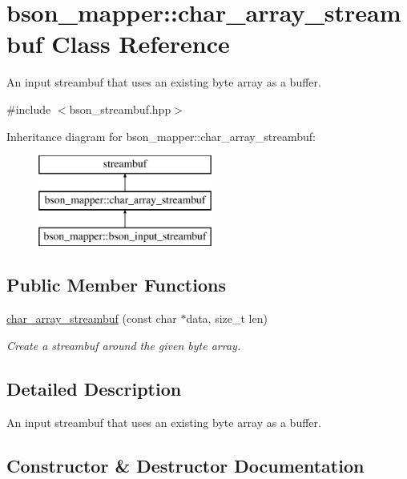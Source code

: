 \hypertarget{classbson__mapper_1_1char__array__streambuf}{}\section{bson\+\_\+mapper\+:\+:char\+\_\+array\+\_\+streambuf Class Reference}
\label{classbson__mapper_1_1char__array__streambuf}


An input streambuf that uses an existing byte array as a buffer.  




{\ttfamily \#include $<$bson\+\_\+streambuf.\+hpp$>$}

Inheritance diagram for bson\+\_\+mapper\+:\+:char\+\_\+array\+\_\+streambuf\+:\begin{figure}[H]
\begin{center}
\leavevmode
\includegraphics[height=3.000000cm]{classbson__mapper_1_1char__array__streambuf}
\end{center}
\end{figure}
\subsection*{Public Member Functions}
\begin{DoxyCompactItemize}
\item 
\hyperlink{classbson__mapper_1_1char__array__streambuf_a5cba6b0b5b8fab77b956375b4f8f9355}{char\+\_\+array\+\_\+streambuf} (const char $\ast$data, size\+\_\+t len)
\begin{DoxyCompactList}\small\item\em Create a streambuf around the given byte array. \end{DoxyCompactList}\end{DoxyCompactItemize}


\subsection{Detailed Description}
An input streambuf that uses an existing byte array as a buffer. 

\subsection{Constructor \& Destructor Documentation}
